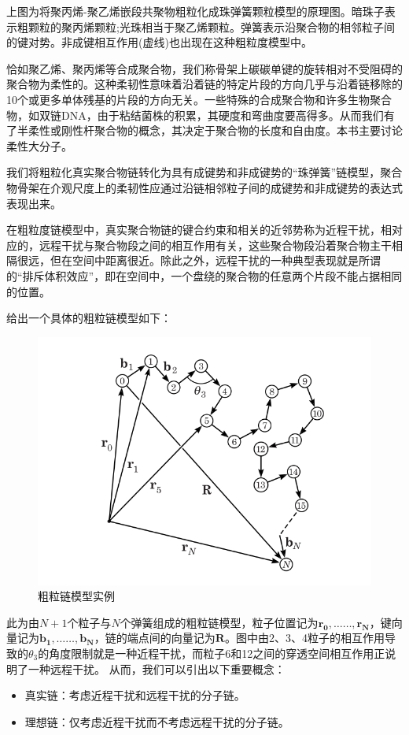 上图为将聚丙烯-聚乙烯嵌段共聚物粗粒化成珠弹簧颗粒模型的原理图。暗珠子表示粗颗粒的聚丙烯颗粒;光珠相当于聚乙烯颗粒。弹簧表示沿聚合物的相邻粒子间的键对势。非成键相互作用(虚线)也出现在这种粗粒度模型中。

恰如聚乙烯、聚丙烯等合成聚合物，我们称骨架上碳碳单键的旋转相对不受阻碍的聚合物为柔性的。这种柔韧性意味着沿着链的特定片段的方向几乎与沿着链移除的10个或更多单体残基的片段的方向无关。一些特殊的合成聚合物和许多生物聚合物，如双链DNA，由于粘结菌株的积累，其硬度和弯曲度要高得多。从而我们有了半柔性或刚性杆聚合物的概念，其决定于聚合物的长度和自由度。本书主要讨论柔性大分子。

我们将粗粒化真实聚合物链转化为具有成键势和非成键势的“珠弹簧”链模型，聚合物骨架在介观尺度上的柔韧性应通过沿链相邻粒子间的成键势和非成键势的表达式表现出来。

在粗粒度链模型中，真实聚合物链的键合约束和相关的近邻势称为近程干扰，相对应的，远程干扰与聚合物段之间的相互作用有关，这些聚合物段沿着聚合物主干相隔很远，但在空间中距离很近。除此之外，远程干扰的一种典型表现就是所谓的“排斥体积效应”，即在空间中，一个盘绕的聚合物的任意两个片段不能占据相同的位置。

给出一个具体的粗粒链模型如下：

\begin{figure}[h]
\centering
\includegraphics[scale=0.5
]{Contents/chapter2/figures/2-1.png}
\caption{粗粒链模型实例}
\end{figure}

此为由$N+1$个粒子与$N$个弹簧组成的粗粒链模型，粒子位置记为$\mathbf{r_0},……,\mathbf{r_N}$，键向量记为$\mathbf{b_1},……,\mathbf{b_N}$，链的端点间的向量记为$\mathbf{R}$。图中由2、3、4粒子的相互作用导致的$\theta_3$的角度限制就是一种近程干扰，而粒子6和12之间的穿透空间相互作用正说明了一种远程干扰。
从而，我们可以引出以下重要概念：
\begin{itemize}
	\item 真实链：考虑近程干扰和远程干扰的分子链。
	\item 理想链：仅考虑近程干扰而不考虑远程干扰的分子链。
\end{itemize}

